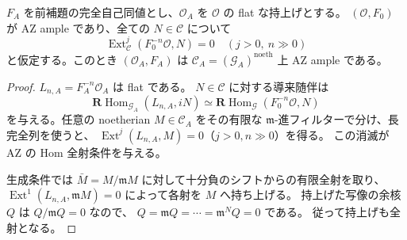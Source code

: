 \begin{lemma}
\label{lem:artin-ample-lift}
$F_A$ を前補題の完全自己同値とし、$\mathcal O_A$ を $\mathcal O$ の flat な持上げとする。
$(\mathcal O,F_0)$ が AZ ample であり、全ての $N\in\mathcal C$ について
\[
 \operatorname{Ext}^{j}_{\mathcal C}(F_0^{-n}\mathcal O,N)=0
 \quad(j>0,\ n\gg0)
\]
と仮定する。このとき $(\mathcal O_A,F_A)$ は
$\mathcal C_A=(\mathcal G_A)^{\mathrm{noeth}}$ 上 AZ ample である。
\end{lemma}
\begin{proof}
$L_{n,A}=F_A^{-n}\mathcal O_A$ は flat である。
$N\in\mathcal C$ に対する導来随伴は
\[
 \mathbf R\operatorname{Hom}_{\mathcal G_A}(L_{n,A},iN)
 \simeq\mathbf R\operatorname{Hom}_{\mathcal G}(F_0^{-n}\mathcal O,N)
\]
を与える。任意の noetherian $M\in\mathcal C_A$ をその有限な
$\mathfrak m$-進フィルターで分け、長完全列を使うと、
$\operatorname{Ext}^{j}(L_{n,A},M)=0$（$j>0,n\gg0$）を得る。
この消滅が AZ の Hom 全射条件を与える。

生成条件では $\bar M=M/\mathfrak mM$ に対して十分負のシフトからの有限全射を取り、
$\operatorname{Ext}^{1}(L_{n,A},\mathfrak mM)=0$ によって各射を $M$ へ持ち上げる。
持上げた写像の余核 $Q$ は $Q/\mathfrak mQ=0$ なので、
$Q=\mathfrak mQ=\cdots=\mathfrak m^NQ=0$ である。
従って持上げも全射となる。
\end{proof}

